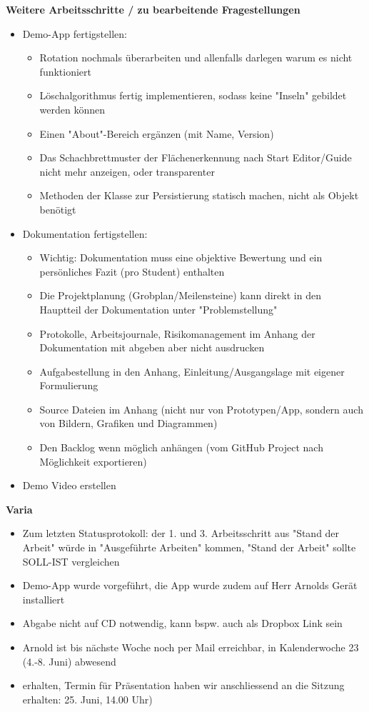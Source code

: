 \textbf{Weitere Arbeitsschritte / zu bearbeitende Fragestellungen}
\begin{itemize}
	\item Demo-App fertigstellen:
	\begin{itemize}
		\item Rotation nochmals überarbeiten und allenfalls darlegen warum es nicht funktioniert
		\item Löschalgorithmus fertig implementieren, sodass keine "Inseln" gebildet werden können
		\item Einen "About"-Bereich ergänzen (mit Name, Version)
		\item Das Schachbrettmuster der Flächenerkennung nach Start Editor/Guide nicht mehr anzeigen, oder transparenter
		\item Methoden der Klasse zur Persistierung statisch machen, nicht als Objekt benötigt
	\end{itemize}
	\item Dokumentation fertigstellen:
	\begin{itemize}
		\item Wichtig: Dokumentation muss eine objektive Bewertung und ein persönliches Fazit (pro Student) enthalten
		\item Die Projektplanung (Grobplan/Meilensteine) kann direkt in den Hauptteil der Dokumentation unter "Problemstellung"
		\item Protokolle, Arbeitsjournale, Risikomanagement im Anhang der Dokumentation mit abgeben aber nicht ausdrucken
		\item Aufgabestellung in den Anhang, Einleitung/Ausgangslage mit eigener Formulierung
		\item Source Dateien im Anhang (nicht nur von Prototypen/App, sondern auch von Bildern, Grafiken und Diagrammen)
		\item Den Backlog wenn möglich anhängen (vom GitHub Project nach Möglichkeit exportieren)
	\end{itemize}
	\item Demo Video erstellen
\end{itemize}

\textbf{Varia}
\begin{itemize}
	\item Zum letzten Statusprotokoll: der 1. und 3. Arbeitsschritt aus "Stand der Arbeit" würde in "Ausgeführte Arbeiten" kommen, "Stand der Arbeit" sollte SOLL-IST vergleichen
	\item Demo-App wurde vorgeführt, die App wurde zudem auf Herr Arnolds Gerät installiert
	\item Abgabe nicht auf CD notwendig, kann bspw. auch als Dropbox Link sein
	\item Arnold ist bis nächste Woche noch per Mail erreichbar, in Kalenderwoche 23 (4.-8. Juni) abwesend
	\item erhalten, Termin für Präsentation haben wir anschliessend an die Sitzung erhalten: 25. Juni, 14.00 Uhr)
\end{itemize}


